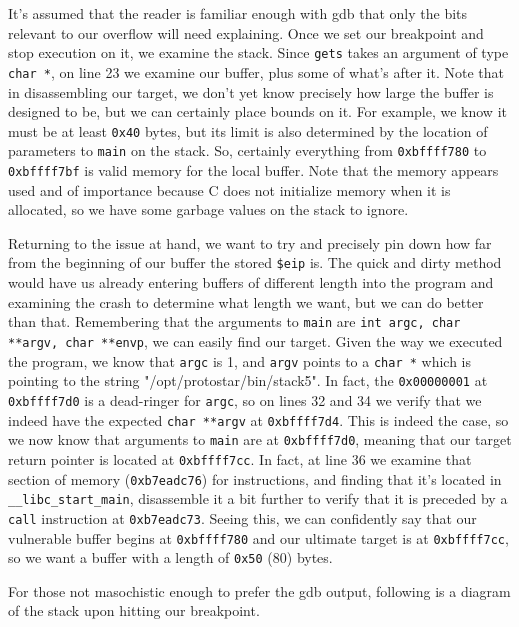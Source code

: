 It's assumed that the reader is familiar enough with gdb that only the bits relevant to our overflow
will need explaining. Once we set our breakpoint and stop execution on it, we examine the stack.
Since \texttt{gets} takes an argument of type \texttt{char *}, on line 23 we examine our buffer, 
plus some of what's after it. Note that in disassembling our target, we don't yet know precisely
how large the buffer is designed to be, but we can certainly place bounds on it. For example,
we know it must be at least \texttt{0x40} bytes, but its limit is also determined by the
location of parameters to \texttt{main} on the stack. So, certainly everything 
from \texttt{0xbffff780} to \texttt{0xbffff7bf} is valid memory for the local buffer. Note that
the memory appears used and of importance because C does not initialize memory when it is allocated,
so we have some garbage values on the stack to ignore.

Returning to the issue at hand, we want to try and precisely pin down how far from the beginning of our
buffer the stored \texttt{\$eip} is. The quick and dirty method would have us already entering
buffers of different length into the program and examining the crash to determine what length
we want, but we can do better than that. Remembering that the arguments to \texttt{main}
are \texttt{int argc, char **argv, char **envp}, we can easily find our target. Given the
way we executed the program, we know that \texttt{argc} is 1, and \texttt{argv} points to a
\texttt{char *} which is pointing to the string "/opt/protostar/bin/stack5". In fact, the
\texttt{0x00000001} at \texttt{0xbffff7d0} is a dead-ringer for \texttt{argc}, so on lines
32 and 34 we verify that we indeed have the expected \texttt{char **argv} at \texttt{0xbffff7d4}.
This is indeed the case, so we now know that arguments to \texttt{main} are at \texttt{0xbffff7d0},
meaning that our target return pointer is located at \texttt{0xbffff7cc}. In fact, at line 36
we examine that section of memory (\texttt{0xb7eadc76}) for instructions, and finding that it's located
in \texttt{\_\_libc\_start\_main}, disassemble it a bit further to verify that it is preceded by a 
\texttt{call} instruction at \texttt{0xb7eadc73}. Seeing this, we can confidently say that
our vulnerable buffer begins at \texttt{0xbffff780} and our ultimate target is at \texttt{0xbffff7cc},
so we want a buffer with a length of \texttt{0x50} (80) bytes.

For those not masochistic enough to prefer the gdb output, following is a diagram of the stack upon hitting
our breakpoint.

